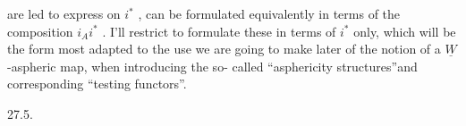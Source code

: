 
are led to express on $i^*$ , can be formulated equivalently in terms of
the composition $i_Ai^*$ . I'll restrict to formulate these in terms of $i^*$
only, which will be the form most adapted to the use we are going to
make later of the notion of a $\underline{W}$-aspheric map, when introducing the so-%
called ``asphericity structures''\hand{/}and corresponding ``testing functors''.


27.5.

